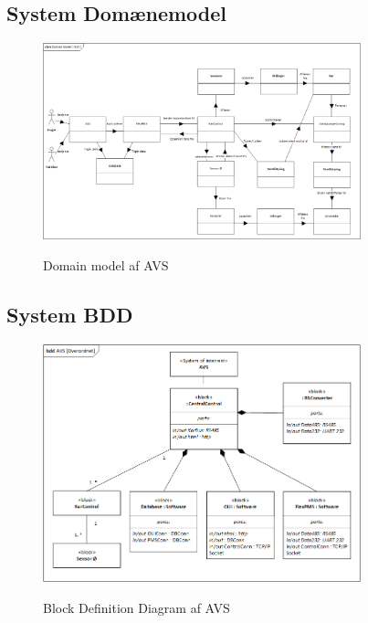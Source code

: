 
\subsection{System Domænemodel}

\begin{figure}[H]
	\centering
	\includegraphics[width=0.82\textwidth]{Systemarkitektur/System/AVS_domain_model.png}
	\label{fig:System BDD}
	\caption{Domain model af AVS}
\end{figure}



\subsection{System BDD}

\begin{figure}[H]
	\centering
	\includegraphics[width=0.82\textwidth]{Systemarkitektur/System/AVS_SystemdiagramBDD.png}
	\label{fig:System BDD}
	\caption{Block Definition Diagram af AVS}
\end{figure}


